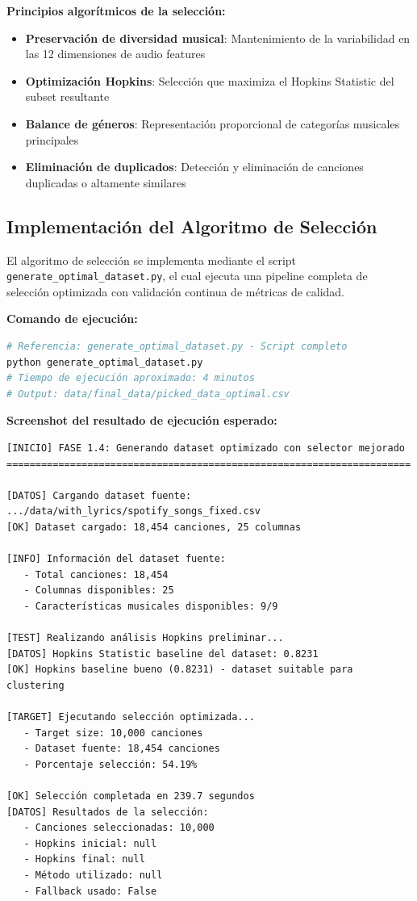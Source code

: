 \documentclass[12pt,a4paper]{report}
\begin{document}
\textbf{Principios algorítmicos de la selección:}
\begin{itemize}[leftmargin=*]
    \item \textbf{Preservación de diversidad musical}: Mantenimiento de la variabilidad en las 12 dimensiones de audio features
    \item \textbf{Optimización Hopkins}: Selección que maximiza el Hopkins Statistic del subset resultante
    \item \textbf{Balance de géneros}: Representación proporcional de categorías musicales principales
    \item \textbf{Eliminación de duplicados}: Detección y eliminación de canciones duplicadas o altamente similares
\end{itemize}

\subsection{Implementación del Algoritmo de Selección}

El algoritmo de selección se implementa mediante el script \texttt{generate\_optimal\_dataset.py}, el cual ejecuta una pipeline completa de selección optimizada con validación continua de métricas de calidad.

\textbf{Comando de ejecución:}
\begin{lstlisting}[language=bash]
# Referencia: generate_optimal_dataset.py - Script completo
python generate_optimal_dataset.py
# Tiempo de ejecución aproximado: 4 minutos
# Output: data/final_data/picked_data_optimal.csv
\end{lstlisting}

\textbf{Screenshot del resultado de ejecución esperado:}
\begin{lstlisting}
[INICIO] FASE 1.4: Generando dataset optimizado con selector mejorado
======================================================================

[DATOS] Cargando dataset fuente: .../data/with_lyrics/spotify_songs_fixed.csv
[OK] Dataset cargado: 18,454 canciones, 25 columnas

[INFO] Información del dataset fuente:
   - Total canciones: 18,454
   - Columnas disponibles: 25
   - Características musicales disponibles: 9/9

[TEST] Realizando análisis Hopkins preliminar...
[DATOS] Hopkins Statistic baseline del dataset: 0.8231
[OK] Hopkins baseline bueno (0.8231) - dataset suitable para clustering

[TARGET] Ejecutando selección optimizada...
   - Target size: 10,000 canciones
   - Dataset fuente: 18,454 canciones
   - Porcentaje selección: 54.19%

[OK] Selección completada en 239.7 segundos
[DATOS] Resultados de la selección:
   - Canciones seleccionadas: 10,000
   - Hopkins inicial: null
   - Hopkins final: null
   - Método utilizado: null
   - Fallback usado: False
\end{lstlisting}
\end{document}
